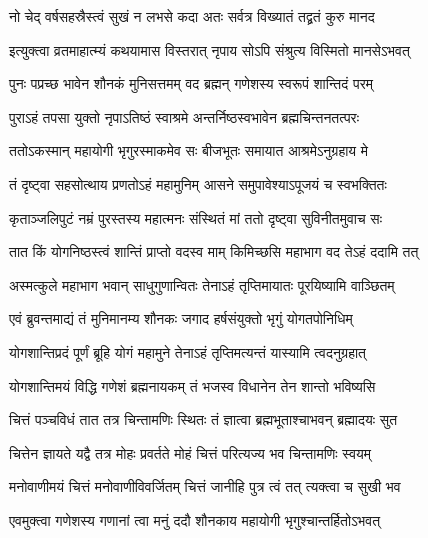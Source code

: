 \twolineshloka
{नो चेद् वर्षसहस्रैस्त्वं सुखं न लभसे कदा}
{अतः सर्वत्र विख्यातं तद्व्रतं कुरु मानद} %

\twolineshloka
{इत्युक्त्वा व्रतमाहात्म्यं कथयामास विस्तरात्}
{नृपाय सोऽपि संश्रुत्य विस्मितो मानसेऽभवत्} %

\twolineshloka
{पुनः पप्रच्छ भावेन शौनकं मुनिसत्तमम्}
{वद ब्रह्मन् गणेशस्य स्वरूपं शान्तिदं परम्} %


\twolineshloka
{पुराऽहं तपसा युक्तो नृपाऽतिष्ठं स्वाश्रमे}
{अन्तर्निष्ठस्वभावेन ब्रह्मचिन्तनतत्परः} %

\twolineshloka
{ततोऽकस्मान् महायोगी भृगुरस्माकमेव सः}
{बीजभूतः समायात आश्रमेऽनुग्रहाय मे} %

\twolineshloka
{तं दृष्ट्वा सहसोत्थाय प्रणतोऽहं महामुनिम्}
{आसने समुपावेश्याऽपूजयं च स्वभक्तितः} %

\twolineshloka
{कृताञ्जलिपुटं नम्रं पुरस्तस्य महात्मनः}
{संस्थितं मां ततो दृष्ट्वा सुविनीतमुवाच सः} %


\twolineshloka
{तात किं योगनिष्ठस्त्वं शान्तिं प्राप्तो वदस्व माम्}
{किमिच्छसि महाभाग वद तेऽहं ददामि तत्} %

\twolineshloka
{अस्मत्कुले महाभाग भवान् साधुगुणान्वितः}
{तेनाऽहं तृप्तिमायातः पूरयिष्यामि वाञ्छितम्} %

\twolineshloka
{एवं ब्रुवन्तमाद्यं तं मुनिमानम्य शौनकः}
{जगाद हर्षसंयुक्तो भृगुं योगतपोनिधिम्} %


\twolineshloka
{योगशान्तिप्रदं पूर्णं ब्रूहि योगं महामुने}
{तेनाऽहं तृप्तिमत्यन्तं यास्यामि त्वदनुग्रहात्} %


\twolineshloka
{योगशान्तिमयं विद्धि गणेशं ब्रह्मनायकम्}
{तं भजस्व विधानेन तेन शान्तो भविष्यसि} %

\twolineshloka
{चित्तं पञ्चविधं तात तत्र चिन्तामणिः स्थितः}
{तं ज्ञात्वा ब्रह्मभूताश्चाभवन् ब्रह्मादयः सुत} %

\twolineshloka
{चित्तेन ज्ञायते यद्वै तत्र मोहः प्रवर्तते}
{मोहं चित्तं परित्यज्य भव चिन्तामणिः स्वयम्} %

\twolineshloka
{मनोवाणीमयं चित्तं मनोवाणीविवर्जितम्}
{चित्तं जानीहि पुत्र त्वं तत् त्यक्त्वा च सुखी भव} %

\twolineshloka
{एवमुक्त्वा गणेशस्य गणानां त्वा मनुं ददौ}
{शौनकाय महायोगी भृगुश्चान्तर्हितोऽभवत्} %


